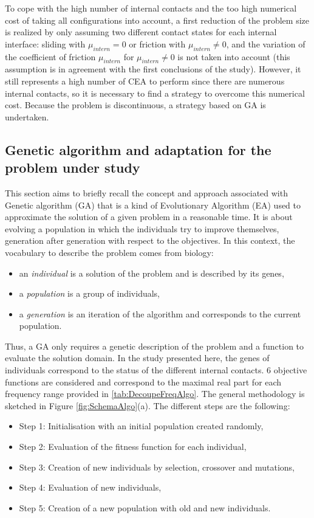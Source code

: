 \documentclass[final,1p]{elsarticle}
\begin{document}
To cope with the high number of internal contacts and the too high numerical cost of taking all configurations into account, a first reduction of the problem size is realized by only assuming two different contact states  for each internal interface: sliding with $\mu_{intern} =0$ or friction with $\mu_{intern} \neq 0$, and the variation of the coefficient of friction $\mu_{intern}$ for $\mu_{intern} \neq 0$ is not taken into account (this assumption is in agreement with the first conclusions of the study). However, it still represents a high number of CEA to perform since there are numerous internal contacts, so it is necessary to find a strategy to overcome this numerical cost. Because the problem is discontinuous, a strategy based on GA is undertaken.


\subsection{Genetic algorithm and adaptation for the problem under study }
\label{subsec:GA}

This section aims to briefly recall the concept and approach associated with Genetic algorithm (GA) that is a kind of Evolutionary Algorithm (EA) used to approximate the solution of a given problem in a reasonable time. It is about evolving a population in which the individuals try to improve themselves, generation after generation with respect to the objectives. In this context, the vocabulary to describe the problem comes from biology: 
\begin{itemize}
	\item an \textit{individual} is a solution of the problem and is described by its genes,
	\item a \textit{population} is a group of individuals,
	\item a \textit{generation} is an iteration of the algorithm and corresponds to the current population.
\end{itemize}

Thus, a GA only requires a genetic description of the problem and a function to evaluate the solution domain. In the study presented here, the genes of individuals correspond to the status of the different internal contacts. $6$ objective functions are considered and correspond to the maximal real part for each frequency range provided in \ref{tab:DecoupeFreqAlgo}. The general methodology is sketched in Figure \ref{fig:SchemaAlgo}(a). The different steps are the following:
\begin{itemize}
	\item Step 1: Initialisation with an initial population created randomly,
	\item Step 2: Evaluation of the fitness function for each individual,
	\item Step 3: Creation of new individuals by selection, crossover and mutations,
	\item Step 4: Evaluation of new individuals,
	\item Step 5: Creation of a new population with old and new individuals.
\end{itemize}
\end{document}
